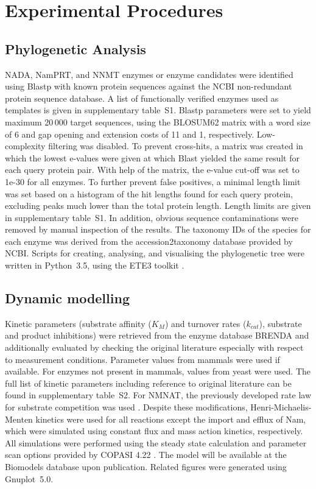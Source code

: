 
\section{Experimental Procedures}

\subsection{Phylogenetic Analysis}

NADA, NamPRT, and NNMT enzymes or enzyme candidates were identified using Blastp with known protein sequences against the NCBI non-redundant protein sequence database. A list of functionally verified enzymes used as templates is given in supplementary table~S1. Blastp parameters were set to yield maximum 20\,000 target sequences, using the BLOSUM62 matrix with a word size of 6 and gap opening and extension costs of 11 and 1, respectively. Low-complexity filtering was disabled. To prevent cross-hits, a matrix was created in which the lowest e-values were given at which Blast yielded the same result for each query protein pair. With help of the matrix, the e-value cut-off was set to 1e-30 for all enzymes. To further prevent false positives, a minimal length limit was set based on a histogram of the hit lengths found for each query protein, excluding peaks much lower than the total protein length. Length limits are given in supplementary table~S1. In addition, obvious sequence contaminations were removed by manual inspection of the results. The taxonomy IDs of the species for each enzyme was derived from the accession2taxonomy database provided by NCBI. Scripts for creating, analysing, and visualising the phylogenetic tree were written in Python~3.5, using the ETE3 toolkit \cite{Huerta-Cepas2016}.


\subsection{Dynamic modelling}

Kinetic parameters (substrate affinity ($K_{M}$) and turnover rates ($k_{cat}$), substrate and product inhibitions) were retrieved from the enzyme database BRENDA and additionally evaluated by checking the original literature especially with respect to measurement conditions. Parameter values from mammals were used if available. For enzymes not present in mammals, values from yeast were used. The full list of kinetic parameters including reference to original literature can be found in supplementary table~S2. For NMNAT, the previously developed rate law for substrate competition was used \cite{Schauble2013}. Despite these modifications, Henri-Michaelis-Menten kinetics were used for all reactions except the import and efflux of Nam, which were simulated using constant flux and mass action kinetics, respectively. All simulations were performed using the steady state calculation and parameter scan options provided by COPASI 4.22 \cite{Hoops2006}. The model will be available at the Biomodels database upon publication. Related figures were generated using Gnuplot~5.0.


